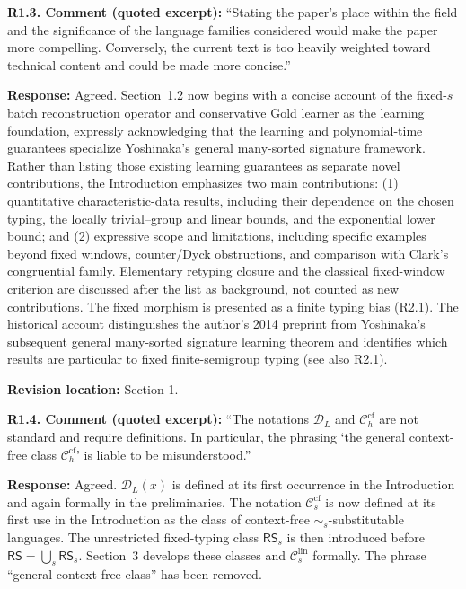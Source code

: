 \documentclass[
  10pt,
  a4paper,
]{article}
\begin{document}
\textbf{R1.3. Comment (quoted excerpt):} ``Stating the paper's place within
the field and the significance of the language families considered would
make the paper more compelling. Conversely, the current text is too
heavily weighted toward technical content and could be made more
concise.''

\textbf{Response:} Agreed. Section~1.2 now begins with a concise
account of the fixed-$s$ batch reconstruction operator and conservative
Gold learner as the learning foundation, expressly acknowledging that
the learning and polynomial-time guarantees specialize Yoshinaka's general
many-sorted signature framework. Rather than listing those existing
learning guarantees as separate novel contributions, the Introduction emphasizes two
main contributions: (1) quantitative characteristic-data results,
including their dependence on the chosen typing, the
locally trivial--group and linear bounds, and the exponential
lower bound; and (2) expressive scope and limitations,
including specific examples beyond fixed windows, counter/Dyck
obstructions, and comparison with Clark's congruential family.
Elementary retyping closure and the classical fixed-window criterion
are discussed after the list as background, not counted as new
contributions. The fixed morphism is presented as a finite
typing bias (R2.1). The historical account distinguishes the
author's 2014 preprint from Yoshinaka's subsequent general many-sorted
signature learning theorem and identifies which results are particular
to fixed finite-semigroup typing (see also R2.1).

\textbf{Revision location:} Section 1.


\textbf{R1.4. Comment (quoted excerpt):} ``The notations \(\mathcal D_L\) and
\(\mathcal C_h^{\mathrm{cf}}\) are not standard and require definitions.
In particular, the phrasing `the general context-free class
\(\mathcal C_h^{\mathrm{cf}}\)' is liable to be misunderstood.''

\textbf{Response:} Agreed. \(\mathcal D_L(x)\) is defined at its first
occurrence in the Introduction and again formally in the preliminaries. The
notation \(\mathcal C_s^{\mathrm{cf}}\) is now defined at its first use in the
Introduction as the class of context-free \(\sim_s\)-substitutable languages.
The unrestricted fixed-typing class \(\mathsf{RS}_s\)
is then introduced before \(\mathsf{RS}=\bigcup_s\mathsf{RS}_s\).
Section~3 develops these classes and
\(\mathcal C_s^{\mathrm{lin}}\) formally. The phrase ``general context-free
class'' has been removed.
\end{document}
